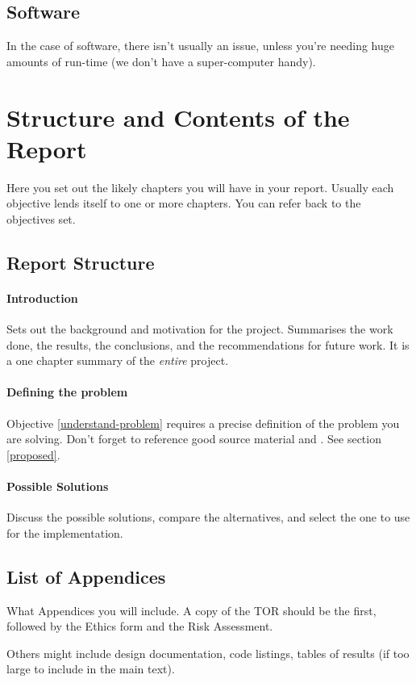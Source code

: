 \subsection{Software}
In the case of software, there isn't usually an issue, unless you're needing huge amounts of run-time (we don't have a super-computer handy).

\section{Structure and Contents of the Report}
Here you set out the likely chapters you will have in your report.  Usually each objective lends itself to one or more chapters.  You can refer back to the objectives set.
\subsection{Report Structure}

\paragraph{Introduction}  Sets out the background and motivation for the project.  Summarises the work done, the results, the conclusions, and the recommendations for future work.  It is a one chapter summary of the \emph{entire} project.

\paragraph{Defining the problem}  Objective \ref{understand-problem} requires a precise definition of the problem you are solving.  Don't forget to reference good source material \citep{henning_schulzrinne} and \citep{talbot2013}.  See section \ref{proposed}.

\paragraph{Possible Solutions} Discuss the possible solutions, compare the
alternatives, and select the one to use for the  implementation.

\subsection{List of Appendices}
What Appendices you will include.  A copy of the TOR should be the first, followed by the Ethics form and the Risk Assessment.

Others might include design documentation, code listings, tables of results (if too large to include in the main text).

